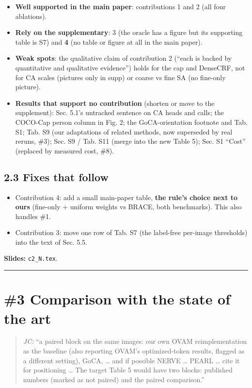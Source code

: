 \documentclass[
  10pt,
]{article}
\providecommand{\tightlist}{%
  \setlength{\itemsep}{0pt}\setlength{\parskip}{0pt}}
\begin{document}
\begin{itemize}
\tightlist
\item
  \textbf{Well supported in the main paper}: contributions 1 and 2 (all
  four ablations).
\item
  \textbf{Rely on the supplementary}: 3 (the oracle has a figure but its
  supporting table is S7) and \textbf{4} (no table or figure at all in
  the main paper).
\item
  \textbf{Weak spots}: the qualitative claim of contribution 2 (``each
  is backed by quantitative and qualitative evidence'') holds for the
  cap and DenseCRF, not for CA scales (pictures only in supp) or coarse
  vs fine SA (no fine-only picture).
\item
  \textbf{Results that support no contribution} (shorten or move to the
  supplement): Sec. 5.1's untracked sentence on CA heads and calls; the
  COCO-Cap person column in Fig. 2; the GoCA-orientation footnote and
  Tab. S1; Tab. S9 (our adaptations of related methods, now superseded
  by real reruns, \#3); Sec. S9 / Tab. S11 (merge into the new Table 5);
  Sec. S1 ``Cost'' (replaced by measured cost, \#8).
\end{itemize}

\subsection{2.3 Fixes that follow}

\begin{itemize}
\tightlist
\item
  Contribution 4: add a small main-paper table, \textbf{the rule's
  choice next to ours} (fine-only + uniform weights vs BRACE, both
  benchmarks). This also handles \#1.
\item
  Contribution 3: move one row of Tab. S7 (the label-free per-image
  thresholds) into the text of Sec. 5.5.
\end{itemize}

\textbf{Slides:} \texttt{c2\_N.tex}.

\begin{center}\rule{0.5\linewidth}{0.5pt}\end{center}

\section{\#3 Comparison with the state of the art}

\begin{quote}
\emph{JC:} ``a paired block on the same images: our own OVAM
reimplementation as the baseline (also reporting OVAM's optimized-token
results, flagged as a different setting), GoCA, \ldots{} and if possible
NERVE \ldots{} PEARL \ldots{} cite it for positioning \ldots{} The
target Table 5 would have two blocks: published numbers (marked as not
paired) and the paired comparison.''
\end{quote}
\end{document}
